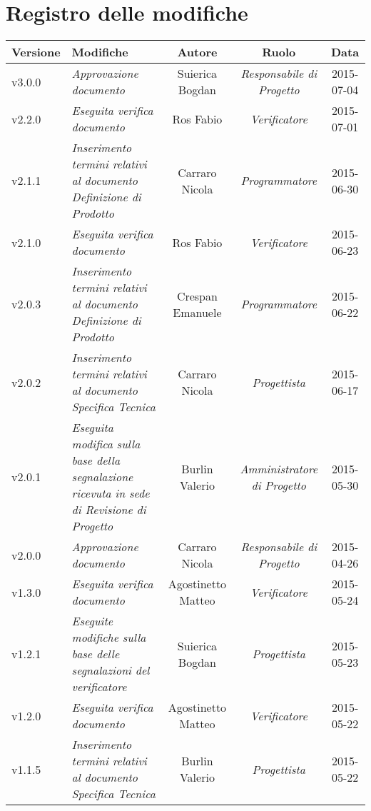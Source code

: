 \newpage
\section*{Registro delle modifiche}

\begin{table}[h]
\centering
\begin{tabular}{|p{}|p{}|c|c|c|}
	\toprule
		\textbf{Versione} & \textbf{Modifiche} & \textbf{Autore} & \textbf{Ruolo} & \textbf{Data} \\
	\midrule
	\midrule
		v3.0.0 & \textit{Approvazione documento} & Suierica Bogdan & \textit{Responsabile di Progetto} & 2015-07-04\\
	\midrule
		v2.2.0 & \textit{Eseguita verifica documento} & Ros Fabio & \textit{Verificatore} & 2015-07-01\\
	\midrule
		v2.1.1 & \textit{Inserimento termini relativi al documento Definizione di Prodotto} & Carraro Nicola & \textit{Programmatore} & 2015-06-30\\
	\midrule
		v2.1.0 & \textit{Eseguita verifica documento} & Ros Fabio & \textit{Verificatore} & 2015-06-23\\
	\midrule
		v2.0.3 & \textit{Inserimento termini relativi al documento Definizione di Prodotto} & Crespan Emanuele & \textit{Programmatore} & 2015-06-22\\
	\midrule
		v2.0.2 & \textit{Inserimento termini relativi al documento Specifica Tecnica} & Carraro Nicola & \textit{Progettista} & 2015-06-17\\
	\midrule
		v2.0.1 & \textit{Eseguita modifica sulla base della segnalazione ricevuta in sede di Revisione di Progetto} & Burlin Valerio & \textit{Amministratore di Progetto} & 2015-05-30\\
	\midrule
		v2.0.0 & \textit{Approvazione documento} & Carraro Nicola & \textit{Responsabile di Progetto} & 2015-04-26\\
	\midrule
		v1.3.0 & \textit{Eseguita verifica documento} & Agostinetto Matteo & \textit{Verificatore} & 2015-05-24\\
	\midrule
		v1.2.1 & \textit{Eseguite modifiche sulla base delle segnalazioni del verificatore} & Suierica Bogdan & \textit{Progettista} & 2015-05-23\\
	\midrule
		v1.2.0 & \textit{Eseguita verifica documento} & Agostinetto Matteo & \textit{Verificatore} & 2015-05-22\\
	\midrule
		v1.1.5 & \textit{Inserimento termini relativi al documento Specifica Tecnica} & Burlin Valerio & \textit{Progettista} & 2015-05-22\\

\end{tabular}
\end{table}
